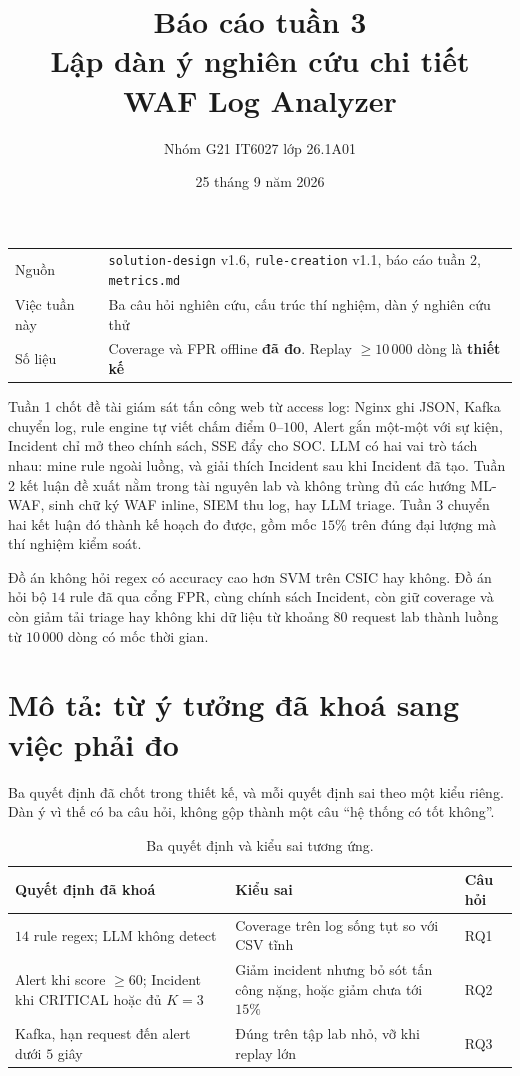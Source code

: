 \documentclass[a4paper,11pt]{article}
\title{\textbf{Báo cáo tuần 3}\\[0.35em]
\large Lập dàn ý nghiên cứu chi tiết\\
\large WAF Log Analyzer}
\author{Nhóm G21 \quad IT6027 \quad lớp 26.1A01}
\date{25 tháng 9 năm 2026}
\begin{document}
\maketitle
\thispagestyle{empty}

\begin{center}
\small
\begin{tabular}{@{}ll@{}}
\toprule
Nguồn & \texttt{solution-design} v1.6, \texttt{rule-creation} v1.1, báo cáo tuần 2, \texttt{metrics.md} \\
Việc tuần này & Ba câu hỏi nghiên cứu, cấu trúc thí nghiệm, dàn ý nghiên cứu thử \\
Số liệu & Coverage và FPR offline \textbf{đã đo}. Replay $\geq 10\,000$ dòng là \textbf{thiết kế} \\
\bottomrule
\end{tabular}
\end{center}

\vspace{0.6em}
\noindent
Tuần 1 chốt đề tài giám sát tấn công web từ access log: Nginx ghi JSON, Kafka chuyển log, rule engine tự viết chấm điểm $0$--$100$, Alert gắn một-một với sự kiện, Incident chỉ mở theo chính sách, SSE đẩy cho SOC. LLM có hai vai trò tách nhau: mine rule ngoài luồng, và giải thích Incident sau khi Incident đã tạo. Tuần 2 kết luận đề xuất nằm trong tài nguyên lab và không trùng đủ các hướng ML-WAF, sinh chữ ký WAF inline, SIEM thu log, hay LLM triage. Tuần 3 chuyển hai kết luận đó thành kế hoạch đo được, gồm mốc $15\%$ trên đúng đại lượng mà thí nghiệm kiểm soát.

\noindent
Đồ án không hỏi regex có accuracy cao hơn SVM trên CSIC hay không. Đồ án hỏi bộ $14$ rule đã qua cổng FPR, cùng chính sách Incident, còn giữ coverage và còn giảm tải triage hay không khi dữ liệu từ khoảng $80$ request lab thành luồng từ $10\,000$ dòng có mốc thời gian.

\section{Mô tả: từ ý tưởng đã khoá sang việc phải đo}

Ba quyết định đã chốt trong thiết kế, và mỗi quyết định sai theo một kiểu riêng. Dàn ý vì thế có ba câu hỏi, không gộp thành một câu ``hệ thống có tốt không''.

\begin{table}[ht]
\centering
\caption{Ba quyết định và kiểu sai tương ứng.}
\label{tab:decisions}
\small
\begin{tabularx}{\linewidth}{@{}p{4.6cm}Y Y@{}}
\toprule
Quyết định đã khoá & Kiểu sai & Câu hỏi \\
\midrule
$14$ rule regex; LLM không detect & Coverage trên log sống tụt so với CSV tĩnh & RQ1 \\
Alert khi score $\geq 60$; Incident khi CRITICAL hoặc đủ $K{=}3$ & Giảm incident nhưng bỏ sót tấn công nặng, hoặc giảm chưa tới $15\%$ & RQ2 \\
Kafka, hạn request đến alert dưới $5$ giây & Đúng trên tập lab nhỏ, vỡ khi replay lớn & RQ3 \\
\bottomrule
\end{tabularx}
\end{table}
\end{document}
